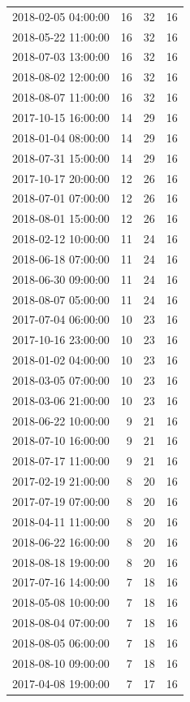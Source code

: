 \begin{tabular}{lrrr}
2018-02-05 04:00:00 & 16 & 32 & 16 \\
2018-05-22 11:00:00 & 16 & 32 & 16 \\
2018-07-03 13:00:00 & 16 & 32 & 16 \\
2018-08-02 12:00:00 & 16 & 32 & 16 \\
2018-08-07 11:00:00 & 16 & 32 & 16 \\
2017-10-15 16:00:00 & 14 & 29 & 16 \\
2018-01-04 08:00:00 & 14 & 29 & 16 \\
2018-07-31 15:00:00 & 14 & 29 & 16 \\
2017-10-17 20:00:00 & 12 & 26 & 16 \\
2018-07-01 07:00:00 & 12 & 26 & 16 \\
2018-08-01 15:00:00 & 12 & 26 & 16 \\
2018-02-12 10:00:00 & 11 & 24 & 16 \\
2018-06-18 07:00:00 & 11 & 24 & 16 \\
2018-06-30 09:00:00 & 11 & 24 & 16 \\
2018-08-07 05:00:00 & 11 & 24 & 16 \\
2017-07-04 06:00:00 & 10 & 23 & 16 \\
2017-10-16 23:00:00 & 10 & 23 & 16 \\
2018-01-02 04:00:00 & 10 & 23 & 16 \\
2018-03-05 07:00:00 & 10 & 23 & 16 \\
2018-03-06 21:00:00 & 10 & 23 & 16 \\
2018-06-22 10:00:00 & 9 & 21 & 16 \\
2018-07-10 16:00:00 & 9 & 21 & 16 \\
2018-07-17 11:00:00 & 9 & 21 & 16 \\
2017-02-19 21:00:00 & 8 & 20 & 16 \\
2017-07-19 07:00:00 & 8 & 20 & 16 \\
2018-04-11 11:00:00 & 8 & 20 & 16 \\
2018-06-22 16:00:00 & 8 & 20 & 16 \\
2018-08-18 19:00:00 & 8 & 20 & 16 \\
2017-07-16 14:00:00 & 7 & 18 & 16 \\
2018-05-08 10:00:00 & 7 & 18 & 16 \\
2018-08-04 07:00:00 & 7 & 18 & 16 \\
2018-08-05 06:00:00 & 7 & 18 & 16 \\
2018-08-10 09:00:00 & 7 & 18 & 16 \\
2017-04-08 19:00:00 & 7 & 17 & 16 \\

\end{tabular}
